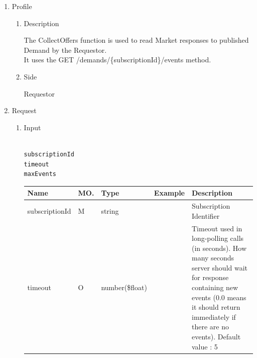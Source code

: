 \begin{enumerate}

\item Profile

\begin{enumerate}

\item Description

The CollectOffers function is used to read Market responses to published Demand by the Requestor.  \\
It uses the GET /demands/\{subscriptionId\}/events method.

\item Side

Requestor

\end{enumerate}

\item Request

\begin{enumerate}

\item Input

\begin{tcolorbox}[boxrule=0pt, frame empty]
\begin{verbatim}

subscriptionId
timeout
maxEvents

\end{verbatim}
\end{tcolorbox}


\begin{center}
\begin{tabular}{|p{3cm}|l|p{3cm}|p{3cm}|p{4cm}|} 
\hline
\rowcolor{lightgray}	Name	& MO.	& Type	& Example & 	Description \\
\hline

subscriptionId	& M	& 	string			&		&	Subscription Identifier \\ 

\hline

timeout			& O	& 	number(\$float)	&		&	Timeout used in long-polling calls (in seconds). 
													How many seconds server should wait for response containing new events 
													(0.0 means it should return immediately if there are no events).	Default value : 5 \\ 


\end{tabular}
\end{center}
\end{enumerate}
\end{enumerate}
